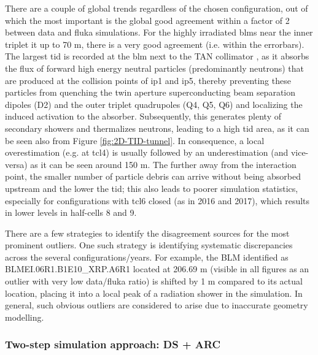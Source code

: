 \documentclass[encoding=utf8,british]{tumphthesis}
\begin{document}
There are a couple of global trends regardless of the chosen configuration, out of which the most important is the global good agreement within a factor of 2 between data and \acrshort{fluka} simulations. For the highly irradiated \acrshort{blm}s near the inner triplet \acrshort{it} up to 70 m, there is a very good agreement (i.e. within the errorbars). The largest \acrshort{tid} is recorded at the \acrshort{blm} next to the TAN collimator \cite{Burkhardt:2120714}, as it absorbs  the  flux  of  forward  high  energy  neutral  particles (predominantly neutrons)  that  are  produced at the collision points of \acrshort{ip}1 and \acrshort{ip}5, thereby preventing  these  particles  from  quenching  the  twin  aperture  superconducting  beam  separation  dipoles  (D2)  and  the  outer  triplet  quadrupoles  (Q4,  Q5,  Q6)  and  localizing  the  induced  activation  to  the  absorber. Subsequently, this generates plenty of secondary showers and thermalizes neutrons, leading to a high \acrshort{tid} area, as it can be seen also from Figure \ref{fig:2D-TID-tunnel}. In consequence, a local overestimation (e.g. at \acrshort{tcl}4) is usually followed by an underestimation (and vice-versa) as it can be seen around 150 m. The further away from the interaction point, the smaller number of particle debris can arrive without being absorbed upstream and the lower the \acrshort{tid}; this also leads to poorer simulation statistics, especially for configurations with \acrshort{tcl}6 closed (as in 2016 and 2017), which results in lower levels in half-cells 8 and 9.

There are a few strategies to identify the disagreement sources for the most prominent outliers. One such strategy is identifying systematic discrepancies across the several configurations/years. For example, the BLM identified as BLMEI.06R1.B1E10\_XRP.A6R1 located at 206.69 m (visible in all figures as an outlier with very low data/\acrshort{fluka} ratio) is shifted by 1 m compared to its actual location, placing it into a local peak of a radiation shower in the simulation. In general, such obvious outliers are considered to arise due to inaccurate geometry modelling.

\subsubsection{Two-step simulation approach: DS + ARC}
\end{document}
